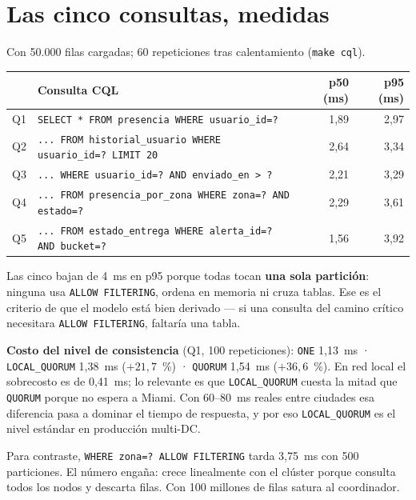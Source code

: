 \documentclass[11pt,a4paper]{article}
\begin{document}
\section{Las cinco consultas, medidas}
Con 50.000 filas cargadas; 60 repeticiones tras calentamiento (\texttt{make cql}).

\begin{center}\small
\begin{tabular}{@{}p{0.7cm}p{7.6cm}rr@{}}
\toprule
& \textbf{Consulta CQL} & \textbf{p50 (ms)} & \textbf{p95 (ms)} \\
\midrule
Q1 & \texttt{SELECT * FROM presencia WHERE usuario\_id=?} & 1,89 & 2,97 \\
Q2 & \texttt{... FROM historial\_usuario WHERE usuario\_id=? LIMIT 20} & 2,64 & 3,34 \\
Q3 & \texttt{... WHERE usuario\_id=? AND enviado\_en > ?} & 2,21 & 3,29 \\
Q4 & \texttt{... FROM presencia\_por\_zona WHERE zona=? AND estado=?} & 2,29 & 3,61 \\
Q5 & \texttt{... FROM estado\_entrega WHERE alerta\_id=? AND bucket=?} & 1,56 & 3,92 \\
\bottomrule
\end{tabular}
\end{center}

\noindent Las cinco bajan de 4~ms en p95 porque todas tocan \textbf{una sola
partición}: ninguna usa \texttt{ALLOW FILTERING}, ordena en memoria ni cruza
tablas. Ese es el criterio de que el modelo está bien derivado — si una consulta
del camino crítico necesitara \texttt{ALLOW FILTERING}, faltaría una tabla.

\smallskip
\noindent\textbf{Costo del nivel de consistencia} (Q1, 100 repeticiones):
\texttt{ONE} 1,13~ms · \texttt{LOCAL\_QUORUM} 1,38~ms ($+21{,}7$~\%) ·
\texttt{QUORUM} 1,54~ms ($+36{,}6$~\%). En red local el sobrecosto es de 0,41~ms;
lo relevante es que \texttt{LOCAL\_QUORUM} cuesta la mitad que \texttt{QUORUM}
porque no espera a Miami. Con 60--80~ms reales entre ciudades esa diferencia pasa a
dominar el tiempo de respuesta, y por eso \texttt{LOCAL\_QUORUM} es el nivel
estándar en producción multi-DC.

\smallskip
\noindent Para contraste, \texttt{WHERE zona=? ALLOW FILTERING} tarda 3,75~ms con
500 particiones. El número engaña: crece linealmente con el clúster porque consulta
todos los nodos y descarta filas. Con 100 millones de filas satura al coordinador.
\end{document}
